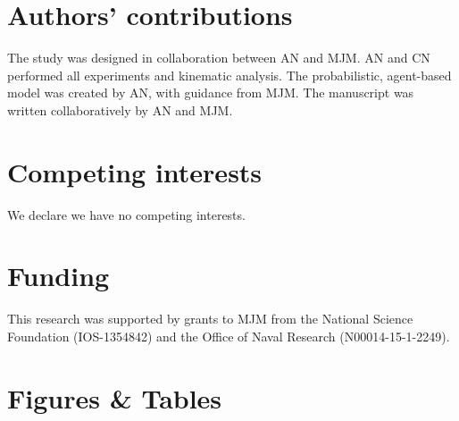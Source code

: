 \documentclass[]{rsos}%
\begin{document}
\section*{Authors' contributions}

The study was designed in collaboration between AN and MJM.
AN and CN performed all experiments and kinematic analysis.
The probabilistic, agent-based model was created by AN, with guidance from MJM. 
The manuscript was written collaboratively by AN and MJM.

\section*{Competing interests}

We declare we have no competing interests.

\section*{Funding}

This research was supported by grants to MJM from the National Science Foundation (IOS-1354842) and the Office of Naval Research (N00014-15-1-2249).





\linespread{1}\selectfont %



\pagebreak



\section*{Figures \& Tables}

\linespread{1.3}\selectfont %
\end{document}
